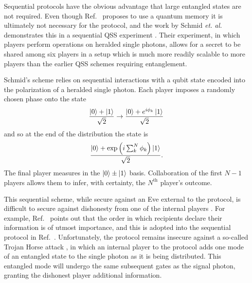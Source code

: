 Sequential protocols have the obvious advantage that large entangled states are not required. Even though Ref.~\cite{Zhang2005} proposes to use a quantum memory it is ultimately not necessary for the protocol, and the work by Schmid \emph{et. al.} demonstrates this in a sequential QSS experiment \cite{Schmid2005}. Their experiment, in which players perform operations on heralded single photons, allows for a secret to be shared among six players in a setup which is much more readily scalable to more players than the earlier QSS schemes requiring entanglement.

Schmid's scheme relies on sequential interactions with a qubit state encoded into the polarization of a heralded single photon. Each player imposes a randomly chosen phase onto the state
\begin{equation}
\frac{\ket{0} + \ket{1}}{\sqrt{2}} \rightarrow \frac{\ket{0} + e^{i \phi_k} \ket{1}}{\sqrt{2}}
\end{equation}
and so at the end of the distribution the state is
\begin{equation}
\frac{\ket{0} + \exp\left(i \sum_{k}^N \phi_k\right)\ket{1}}{\sqrt{2}}.
\end{equation}
The final player measures in the $\ket{0} \pm \ket{1}$ basis. Collaboration of the first $N-1$ players allows them to infer, with certainty, the $N^{\text{th}}$ player's outcome.



This sequential scheme, while secure against an Eve external to the protocol, is difficult to secure against dishonesty from one of the internal players \cite{Deng2005, Qin2006, He2007}. For example, Ref.~\cite{He2007} points out that the order in which recipients declare their information is of utmost importance, and this is adopted into the sequential protocol in Ref.~\cite{Schmid2007}. Unfortunately, the protocol remains insecure against a so-called Trojan Horse attack \cite{Deng2005}, in which an internal player to the protocol adds one mode of an entangled state to the single photon as it is being distributed. This entangled mode will undergo the same subsequent gates as the signal photon, granting the dishonest player additional information. 

